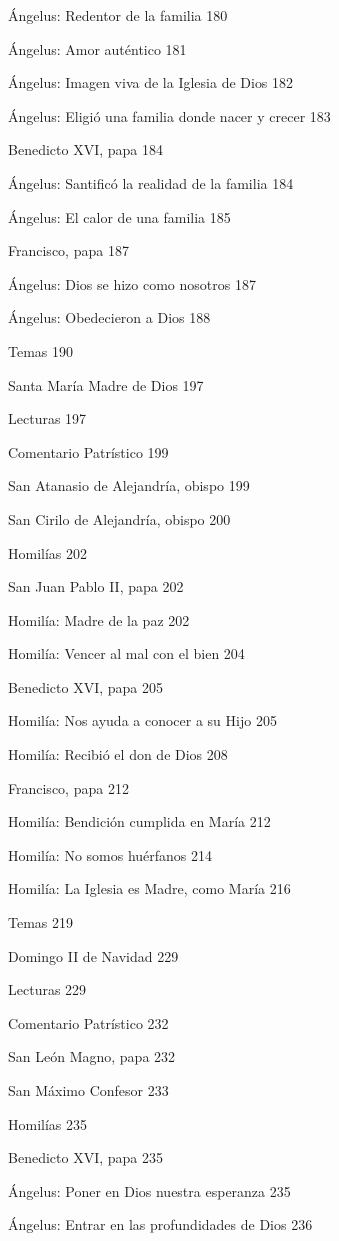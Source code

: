 \documentclass[]{article}
\begin{document}
Ángelus: Redentor de la familia 180

Ángelus: Amor auténtico 181

Ángelus: Imagen viva de la Iglesia de Dios 182

Ángelus: Eligió una familia donde nacer y crecer 183

Benedicto XVI, papa 184

Ángelus: Santificó la realidad de la familia 184

Ángelus: El calor de una familia 185

Francisco, papa 187

Ángelus: Dios se hizo como nosotros 187

Ángelus: Obedecieron a Dios 188

Temas 190

Santa María Madre de Dios 197

Lecturas 197

Comentario Patrístico 199

San Atanasio de Alejandría, obispo 199

San Cirilo de Alejandría, obispo 200

Homilías 202

San Juan Pablo II, papa 202

Homilía: Madre de la paz 202

Homilía: Vencer al mal con el bien 204

Benedicto XVI, papa 205

Homilía: Nos ayuda a conocer a su Hijo 205

Homilía: Recibió el don de Dios 208

Francisco, papa 212

Homilía: Bendición cumplida en María 212

Homilía: No somos huérfanos 214

Homilía: La Iglesia es Madre, como María 216

Temas 219

Domingo II de Navidad 229

Lecturas 229

Comentario Patrístico 232

San León Magno, papa 232

San Máximo Confesor 233

Homilías 235

Benedicto XVI, papa 235

Ángelus: Poner en Dios nuestra esperanza 235

Ángelus: Entrar en las profundidades de Dios 236
\end{document}
